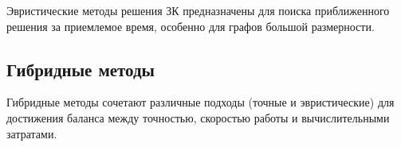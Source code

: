 Эвристические методы решения ЗК предназначены для поиска приближенного решения за приемлемое время, особенно для графов большой размерности.

\subsection{Гибридные методы}
Гибридные методы сочетают различные подходы (точные и эвристические) для достижения баланса между точностью, скоростью работы и вычислительными затратами. 


